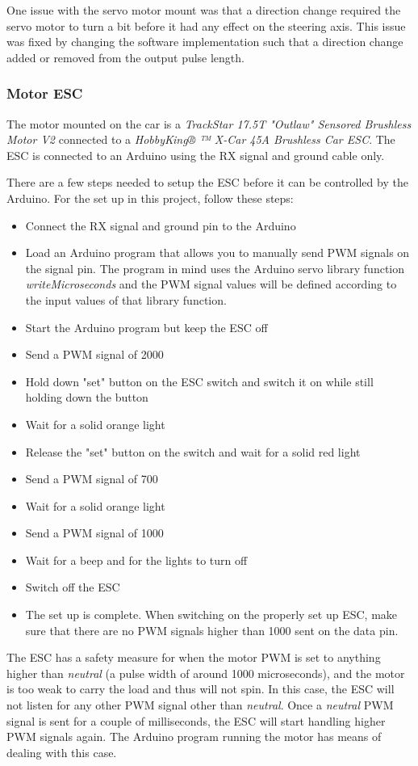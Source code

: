 \documentclass[11pt, titlepage]{article} %
\begin{document}
One issue with the servo motor mount was that a direction change required the servo motor to turn a bit before it had any effect on the steering axis. This issue was fixed by changing the software implementation such that a direction change added or removed from the output pulse length.

\subsubsection{Motor ESC}
The motor mounted on the car is a \textit{TrackStar 17.5T "Outlaw" Sensored Brushless Motor V2} connected to a \textit{HobbyKing® ™ X-Car 45A Brushless Car ESC}. The ESC is connected to an Arduino using the RX signal and ground cable only.

There are a few steps needed to setup the ESC before it can be controlled by the Arduino. For the set up in this project, follow these steps:
\begin{itemize}
	\item Connect the RX signal and ground pin to the Arduino
	\item Load an Arduino program that allows you to manually send PWM signals on the signal pin. The program in mind uses the Arduino servo library function \textit{writeMicroseconds} and the PWM signal values will be defined according to the input values of that library function.
	\item Start the Arduino program but keep the ESC off
	\item Send a PWM signal of 2000
	\item Hold down "set" button on the ESC switch and switch it on while still holding down the button
	\item Wait for a solid orange light
	\item Release the "set" button on the switch and wait for a solid red light
	\item Send a PWM signal of 700
	\item Wait for a solid orange light
	\item Send a PWM signal of 1000
	\item Wait for a beep and for the lights to turn off
	\item Switch off the ESC
	\item The set up is complete. When switching on the properly set up ESC, make sure that there are no PWM signals higher than 1000 sent on the data pin.
\end{itemize}

The ESC has a safety measure for when the motor PWM is set to anything higher than \textit{neutral} (a pulse width of around 1000 microseconds), and the motor is too weak to carry the load and thus will not spin. In this case, the ESC will not listen for any other PWM signal other than \textit{neutral}. Once a \textit{neutral} PWM signal is sent for a couple of milliseconds, the ESC will start handling higher PWM signals again. The Arduino program running the motor has means of dealing with this case.
\end{document}
